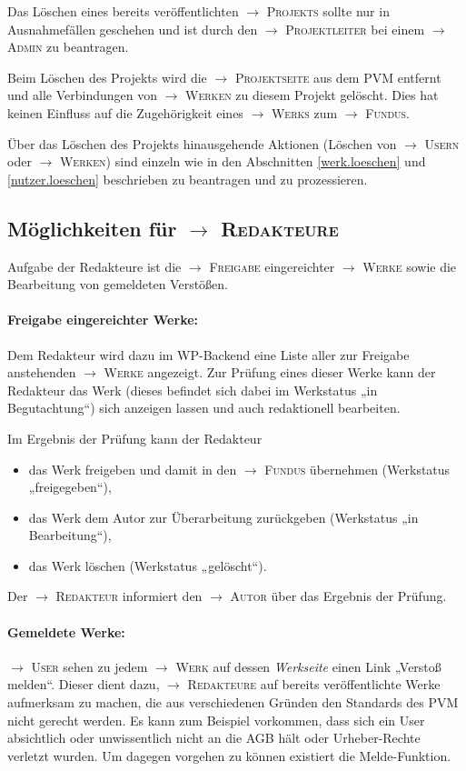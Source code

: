 \documentclass[a4paper,11pt]{article}
\newcommand{\glossar}[1]{{$\to$ \textsc{#1}}}
\begin{document}
Das Löschen eines bereits veröffentlichten \glossar{Projekts} sollte nur in
Ausnahmefällen geschehen und ist durch den \glossar{Projektleiter} bei einem
\glossar{Admin} zu beantragen.

Beim Löschen des Projekts wird die \glossar{Projektseite} aus dem PVM entfernt
und alle Verbindungen von \glossar{Werken} zu diesem Projekt gelöscht.  Dies
hat keinen Einfluss auf die Zugehörigkeit eines \glossar{Werks} zum
\glossar{Fundus}.

Über das Löschen des Projekts hinausgehende Aktionen (Löschen von
\glossar{Usern} oder \glossar{Werken}) sind einzeln wie in den Abschnitten
\ref{werk.loeschen} und \ref{nutzer.loeschen} beschrieben zu beantragen und zu
prozessieren.

\subsection{Möglichkeiten für \glossar{Redakteure}}

Aufgabe der Redakteure ist die \glossar{Freigabe} eingereichter \glossar{Werke}
sowie die Bearbeitung von gemeldeten Verstößen.  

\paragraph{Freigabe eingereichter Werke:} 
Dem Redakteur wird dazu im WP-Backend eine Liste aller zur Freigabe anstehenden
\glossar{Werke} angezeigt.  Zur Prüfung eines dieser Werke kann der Redakteur
das Werk (dieses befindet sich dabei im Werkstatus „in Begutachtung“) sich
anzeigen lassen und auch redaktionell bearbeiten.

Im Ergebnis der Prüfung kann der Redakteur 
\begin{itemize}
\item das Werk freigeben und damit in den \glossar{Fundus} übernehmen
  (Werkstatus „freigegeben“),
\item das Werk dem Autor zur Überarbeitung zurückgeben (Werkstatus „in
  Bearbeitung“),
\item das Werk löschen (Werkstatus „gelöscht“).
\end{itemize}
Der \glossar{Redakteur} informiert den \glossar{Autor} über das Ergebnis der
Prüfung.

\paragraph{Gemeldete Werke:} 
\glossar{User} sehen zu jedem \glossar{Werk} auf dessen \emph{Werkseite} einen
Link „Verstoß melden“.  Dieser dient dazu, \glossar{Redakteure} auf bereits
veröffentlichte Werke aufmerksam zu machen, die aus verschiedenen Gründen den
Standards des PVM nicht gerecht werden.  Es kann zum Beispiel vorkommen, dass
sich ein User absichtlich oder unwissentlich nicht an die AGB hält oder
Urheber-Rechte verletzt wurden. Um dagegen vorgehen zu können existiert die
Melde-Funktion.
\end{document}
